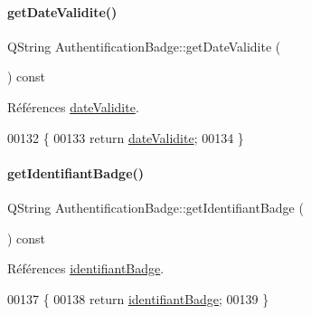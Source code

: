 \paragraph{\texorpdfstring{get\+Date\+Validite()}{getDateValidite()}}
{\footnotesize\ttfamily Q\+String Authentification\+Badge\+::get\+Date\+Validite (\begin{DoxyParamCaption}{ }\end{DoxyParamCaption}) const}



Références \hyperlink{class_authentification_badge_a3ff41c56490c3cfd0322949be2338605}{date\+Validite}.


\begin{DoxyCode}
00132 \{
00133     \textcolor{keywordflow}{return} \hyperlink{class_authentification_badge_a3ff41c56490c3cfd0322949be2338605}{dateValidite};
00134 \}
\end{DoxyCode}
\mbox{\label{class_authentification_badge_a4bb0edf5a4483d9125bc53b1a7e24b7b}} 
\paragraph{\texorpdfstring{get\+Identifiant\+Badge()}{getIdentifiantBadge()}}
{\footnotesize\ttfamily Q\+String Authentification\+Badge\+::get\+Identifiant\+Badge (\begin{DoxyParamCaption}{ }\end{DoxyParamCaption}) const}



Références \hyperlink{class_authentification_badge_a7120366168cbe21efd991a978922eb20}{identifiant\+Badge}.


\begin{DoxyCode}
00137 \{
00138     \textcolor{keywordflow}{return} \hyperlink{class_authentification_badge_a7120366168cbe21efd991a978922eb20}{identifiantBadge};
00139 \}
\end{DoxyCode}
\mbox{\label{class_authentification_badge_ae8c755b184c20626d4362d5e4739dfe1}} 
